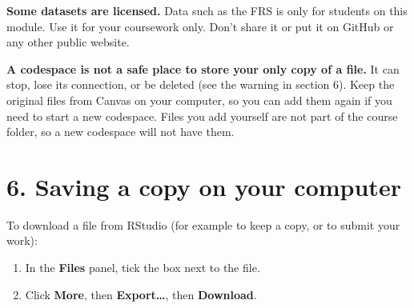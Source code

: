 \documentclass[
  letterpaper,
  DIV=11,
  numbers=noendperiod]{scrreprt}
\providecommand{\tightlist}{%
  \setlength{\itemsep}{0pt}\setlength{\parskip}{0pt}}
\begin{document}
\begin{tcolorbox}[enhanced jigsaw, arc=.35mm, bottomrule=.15mm, bottomtitle=1mm, breakable, colback=white, colbacktitle=quarto-callout-warning-color!10!white, colframe=quarto-callout-warning-color-frame, coltitle=black, left=2mm, leftrule=.75mm, opacityback=0, opacitybacktitle=0.6, rightrule=.15mm, title=\textcolor{quarto-callout-warning-color}{\faExclamationTriangle}\hspace{0.5em}{Warning}, titlerule=0mm, toprule=.15mm, toptitle=1mm]

\textbf{Some datasets are licensed.} Data such as the FRS is only for
students on this module. Use it for your coursework only. Don't share it
or put it on GitHub or any other public website.

\end{tcolorbox}

\begin{tcolorbox}[enhanced jigsaw, arc=.35mm, bottomrule=.15mm, bottomtitle=1mm, breakable, colback=white, colbacktitle=quarto-callout-important-color!10!white, colframe=quarto-callout-important-color-frame, coltitle=black, left=2mm, leftrule=.75mm, opacityback=0, opacitybacktitle=0.6, rightrule=.15mm, title=\textcolor{quarto-callout-important-color}{\faExclamation}\hspace{0.5em}{Important}, titlerule=0mm, toprule=.15mm, toptitle=1mm]

\textbf{A codespace is not a safe place to store your only copy of a
file.} It can stop, lose its connection, or be deleted (see the warning
in section 6). Keep the original files from Canvas on your computer, so
you can add them again if you need to start a new codespace. Files you
add yourself are not part of the course folder, so a new codespace will
not have them.

\end{tcolorbox}

\section*{6. Saving a copy on your
computer}\label{saving-a-copy-on-your-computer}


To download a file from RStudio (for example to keep a copy, or to
submit your work):

\begin{enumerate}
\def\labelenumi{\arabic{enumi}.}
\tightlist
\item
  In the \textbf{Files} panel, tick the box next to the file.
\item
  Click \textbf{More}, then \textbf{Export\ldots{}}, then
  \textbf{Download}.
\end{enumerate}
\end{document}
